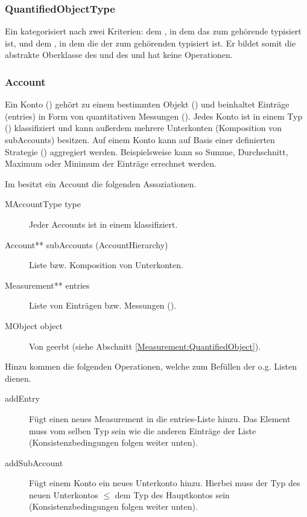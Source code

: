 \subsubsection{QuantifiedObjectType}
Ein  kategorisiert  nach zwei Kriterien: dem , in dem das
zum  gehörende  typisiert ist, und dem , in dem die 
der zum  gehörenden  typisiert ist. Er bildet somit die abstrakte Oberklasse des
 und des  und hat keine Operationen.


\subsubsection{Account}
Ein Konto () gehört zu einem bestimmten Objekt () und beinhaltet Einträge (entries) in Form von quantitativen Messungen (). 
Jedes Konto ist in einem Typ () klassifiziert und kann außerdem mehrere Unterkonten (Komposition von subAccounts) besitzen.
Auf einem Konto kann auf Basis einer definierten Strategie () aggregiert werden. 
Beispielsweise kann so Summe, Durchschnitt, Maximum oder Minimum der Einträge errechnet werden. 

Im \MM besitzt ein Account die folgenden Assoziationen.
\begin{description}
	\item[MAccountType type] Jeder Accounts ist in einem  klassifiziert.
	\item[Account** subAccounts (AccountHierarchy)] Liste bzw. Komposition von Unterkonten.
	\item[Measurement** entries] Liste von Einträgen bzw. Messungen ().
	\item[MObject object] Von  geerbt (siehe Abschnitt \ref{Measurement:QuantifiedObject}).
\end{description}

Hinzu kommen die folgenden Operationen, welche zum Befüllen der o.g. Listen dienen.
\begin{description}
	\item[addEntry] Fügt einen neues Measurement in die entries-Liste hinzu. Das Element muss vom selben Typ sein wie die anderen Einträge der Liste (Konsistenzbedingungen folgen weiter unten).  
	\item[addSubAccount] Fügt einem Konto ein neues Unterkonto hinzu. Hierbei muss der Typ des neuen Unterkontos $\leq$ dem Typ des Hauptkontos sein (Konsistenzbedingungen folgen weiter unten).
\end{description}


